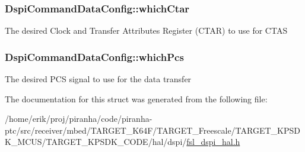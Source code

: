 \subsubsection[{\texorpdfstring{which\+Ctar}{whichCtar}}]{ Dspi\+Command\+Data\+Config\+::which\+Ctar}\hypertarget{structDspiCommandDataConfig_abedde50b4a95ebfb8475cbdd64875447}{}\label{structDspiCommandDataConfig_abedde50b4a95ebfb8475cbdd64875447}
The desired Clock and Transfer Attributes Register (C\+T\+AR) to use for C\+T\+AS 
\subsubsection[{\texorpdfstring{which\+Pcs}{whichPcs}}]{ Dspi\+Command\+Data\+Config\+::which\+Pcs}\hypertarget{structDspiCommandDataConfig_ab8a264f828371aabec0a9a08097c14dd}{}\label{structDspiCommandDataConfig_ab8a264f828371aabec0a9a08097c14dd}
The desired P\+CS signal to use for the data transfer 

The documentation for this struct was generated from the following file\+:\begin{DoxyCompactItemize}
\item 
/home/erik/proj/piranha/code/piranha-\/ptc/src/receiver/mbed/\+T\+A\+R\+G\+E\+T\+\_\+\+K64\+F/\+T\+A\+R\+G\+E\+T\+\_\+\+Freescale/\+T\+A\+R\+G\+E\+T\+\_\+\+K\+P\+S\+D\+K\+\_\+\+M\+C\+U\+S/\+T\+A\+R\+G\+E\+T\+\_\+\+K\+P\+S\+D\+K\+\_\+\+C\+O\+D\+E/hal/dspi/\hyperlink{fsl__dspi__hal_8h}{fsl\+\_\+dspi\+\_\+hal.\+h}\end{DoxyCompactItemize}
